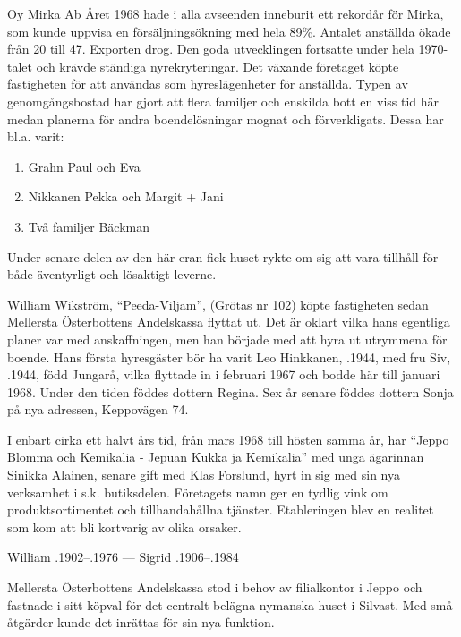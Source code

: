

Oy Mirka Ab	Året 1968 hade i alla avseenden inneburit ett rekordår för Mirka, som kunde uppvisa en försäljningsökning med hela 89\%. Antalet anställda ökade från 20 till 47. Exporten drog. Den goda utvecklingen fortsatte under hela 1970-talet och krävde ständiga nyrekryteringar. Det växande företaget köpte fastigheten för att användas som hyreslägenheter för anställda. Typen av genomgångsbostad har gjort att flera familjer och enskilda bott en viss tid här medan planerna för andra boendelösningar mognat och förverkligats. Dessa har bl.a. varit:
\begin{enumerate}
  \item Grahn Paul och Eva
  \item Nikkanen Pekka och Margit + Jani
  \item Två familjer Bäckman
\end{enumerate}
Under senare delen av den här eran fick huset rykte om sig att vara tillhåll för både äventyrligt och lösaktigt leverne.


William Wikström, ``Peeda-Viljam'', (Grötas nr 102) köpte fastigheten sedan Mellersta Österbottens Andelskassa flyttat ut. Det är oklart vilka hans egentliga planer var med anskaffningen, men han började med att hyra ut utrymmena för boende. Hans första hyresgäster bör ha varit Leo Hinkkanen, .1944, med fru Siv, .1944, född Jungarå, vilka flyttade in i februari 1967 och bodde här till januari 1968. Under den tiden föddes dottern Regina. Sex år senare föddes dottern Sonja på nya adressen, Keppovägen 74.

I enbart cirka ett halvt års tid, från mars 1968 till hösten samma år, har ``Jeppo Blomma och Kemikalia - Jepuan Kukka ja Kemikalia'' med unga ägarinnan Sinikka Alainen, senare gift med Klas Forslund, hyrt in sig med sin nya verksamhet i s.k. butiksdelen. Företagets namn ger en tydlig vink om produktsortimentet och tillhandahållna tjänster. Etableringen blev en realitet som kom att bli kortvarig av olika orsaker.

William .1902--.1976   ---   Sigrid .1906--.1984


Mellersta Österbottens Andelskassa stod i behov av filialkontor i Jeppo och fastnade i sitt köpval för det centralt belägna nymanska huset i Silvast. Med små åtgärder kunde det inrättas för sin nya funktion.

